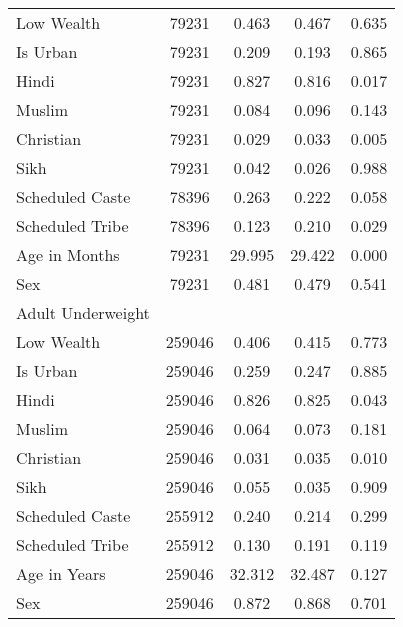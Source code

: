 \begin{tabular}{l*{4}{c}}
Low Wealth  &       79231&       0.463&       0.467&       0.635\\
Is Urban    &       79231&       0.209&       0.193&       0.865\\
Hindi       &       79231&       0.827&       0.816&       0.017\\
Muslim      &       79231&       0.084&       0.096&       0.143\\
Christian   &       79231&       0.029&       0.033&       0.005\\
Sikh        &       79231&       0.042&       0.026&       0.988\\
Scheduled Caste&       78396&       0.263&       0.222&       0.058\\
Scheduled Tribe&       78396&       0.123&       0.210&       0.029\\
Age in Months&       79231&      29.995&      29.422&       0.000\\
Sex         &       79231&       0.481&       0.479&       0.541\\
\hline
Adult Underweight&            &            &            &            \\
Low Wealth  &      259046&       0.406&       0.415&       0.773\\
Is Urban    &      259046&       0.259&       0.247&       0.885\\
Hindi       &      259046&       0.826&       0.825&       0.043\\
Muslim      &      259046&       0.064&       0.073&       0.181\\
Christian   &      259046&       0.031&       0.035&       0.010\\
Sikh        &      259046&       0.055&       0.035&       0.909\\
Scheduled Caste&      255912&       0.240&       0.214&       0.299\\
Scheduled Tribe&      255912&       0.130&       0.191&       0.119\\
Age in Years&      259046&      32.312&      32.487&       0.127\\
Sex         &      259046&       0.872&       0.868&       0.701\\
\hline\hline
\end{tabular}
